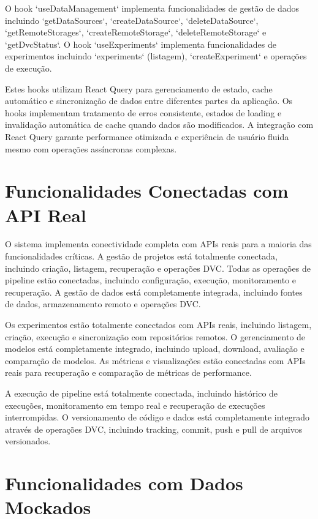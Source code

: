 \documentclass[12pt,a4paper]{article}
\begin{document}
O hook `useDataManagement` implementa funcionalidades de gestão de dados incluindo `getDataSources`, `createDataSource`, `deleteDataSource`, `getRemoteStorages`, `createRemoteStorage`, `deleteRemoteStorage` e `getDvcStatus`. O hook `useExperiments` implementa funcionalidades de experimentos incluindo `experiments` (listagem), `createExperiment` e operações de execução.

Estes hooks utilizam React Query para gerenciamento de estado, cache automático e sincronização de dados entre diferentes partes da aplicação. Os hooks implementam tratamento de erros consistente, estados de loading e invalidação automática de cache quando dados são modificados. A integração com React Query garante performance otimizada e experiência de usuário fluida mesmo com operações assíncronas complexas.

\section{Funcionalidades Conectadas com API Real}

O sistema implementa conectividade completa com APIs reais para a maioria das funcionalidades críticas. A gestão de projetos está totalmente conectada, incluindo criação, listagem, recuperação e operações DVC. Todas as operações de pipeline estão conectadas, incluindo configuração, execução, monitoramento e recuperação. A gestão de dados está completamente integrada, incluindo fontes de dados, armazenamento remoto e operações DVC.

Os experimentos estão totalmente conectados com APIs reais, incluindo listagem, criação, execução e sincronização com repositórios remotos. O gerenciamento de modelos está completamente integrado, incluindo upload, download, avaliação e comparação de modelos. As métricas e visualizações estão conectadas com APIs reais para recuperação e comparação de métricas de performance.

A execução de pipeline está totalmente conectada, incluindo histórico de execuções, monitoramento em tempo real e recuperação de execuções interrompidas. O versionamento de código e dados está completamente integrado através de operações DVC, incluindo tracking, commit, push e pull de arquivos versionados.

\section{Funcionalidades com Dados Mockados}
\end{document}
